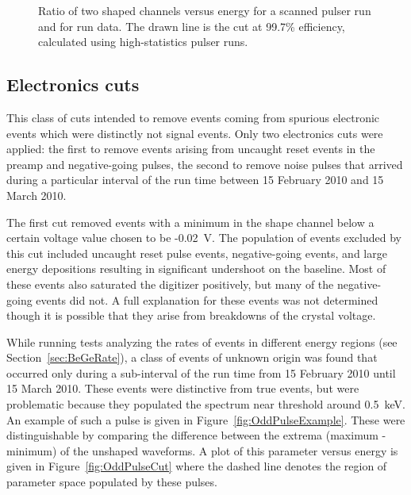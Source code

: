 			\begin{figure}
				\centering
				\caption[Microphonics cuts on data and scanned pulser runs]
				{Ratio of two shaped channels versus energy for a scanned pulser run and for run data.  The drawn line is the cut at 99.7\% efficiency, calculated using
				high-statistics pulser runs.}
				\label{fig:RatioOfShapedChannelsFinal}
			\end{figure}
	
	
		\subsection{Electronics cuts}
		\label{sec:BeGeElecCuts}
	
	This class of cuts intended to remove events coming from spurious electronic events which were distinctly not signal events.  Only two electronics cuts were applied: the first to remove events arising from uncaught reset events in the preamp and negative-going pulses, the second to remove noise pulses that arrived during a particular interval of the run time between 15 February 2010 and 15 March 2010.  
	
	The first cut removed events with a minimum in the shape channel below a certain voltage value chosen to be -0.02~V.  The population of events excluded by this cut included uncaught reset pulse events, negative-going events, and large energy depositions resulting in significant undershoot on the baseline.  Most of these events also saturated the digitizer positively, but many of the negative-going events did not.  A full explanation for these events was not determined though it is possible that they arise from breakdowns of the crystal voltage.  %
	
	While running tests analyzing the rates of events in different energy regions (see Section~\ref{sec:BeGeRate}), a class of events of unknown origin was found that occurred only during a sub-interval of the run time from 15 February 2010 until 15 March 2010.  These events were distinctive from true events, but were problematic because they populated the spectrum near threshold around 0.5~keV.   An example of such a pulse is given in Figure~\ref{fig:OddPulseExample}.  These were distinguishable by comparing the difference between the extrema (maximum - minimum) of the unshaped waveforms.  A plot of this parameter versus energy is given in Figure~\ref{fig:OddPulseCut} where the dashed line denotes the region of parameter space populated by these pulses.  
	
